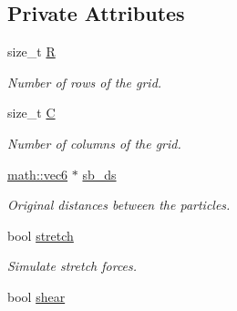 \subsection*{Private Attributes}
\begin{DoxyCompactItemize}
\item 
\mbox{\label{classphysim_1_1meshes_1_1mesh2d__regular_a5940b5ab5b5b67139d13c10e473b4894}} 
size\+\_\+t \hyperlink{classphysim_1_1meshes_1_1mesh2d__regular_a5940b5ab5b5b67139d13c10e473b4894}{R}
\begin{DoxyCompactList}\small\item\em Number of rows of the grid. \end{DoxyCompactList}\item 
\mbox{\label{classphysim_1_1meshes_1_1mesh2d__regular_ae26a7e636588726103a835faf67b7771}} 
size\+\_\+t \hyperlink{classphysim_1_1meshes_1_1mesh2d__regular_ae26a7e636588726103a835faf67b7771}{C}
\begin{DoxyCompactList}\small\item\em Number of columns of the grid. \end{DoxyCompactList}\item 
\hyperlink{structphysim_1_1math_1_1vec6}{math\+::vec6} $\ast$ \hyperlink{classphysim_1_1meshes_1_1mesh2d__regular_ac3a70b7b6b37942d5174ddcc90703993}{sb\+\_\+ds}
\begin{DoxyCompactList}\small\item\em Original distances between the particles. \end{DoxyCompactList}\item 
\mbox{\label{classphysim_1_1meshes_1_1mesh2d__regular_a3101edd8212afd9a35ad11c6666e26be}} 
bool \hyperlink{classphysim_1_1meshes_1_1mesh2d__regular_a3101edd8212afd9a35ad11c6666e26be}{stretch}
\begin{DoxyCompactList}\small\item\em Simulate stretch forces. \end{DoxyCompactList}\item 
\mbox{\label{classphysim_1_1meshes_1_1mesh2d__regular_af25bf35485aa0a40e21a10f4e472721a}} 
bool \hyperlink{classphysim_1_1meshes_1_1mesh2d__regular_af25bf35485aa0a40e21a10f4e472721a}{shear}

\end{DoxyCompactItemize}
